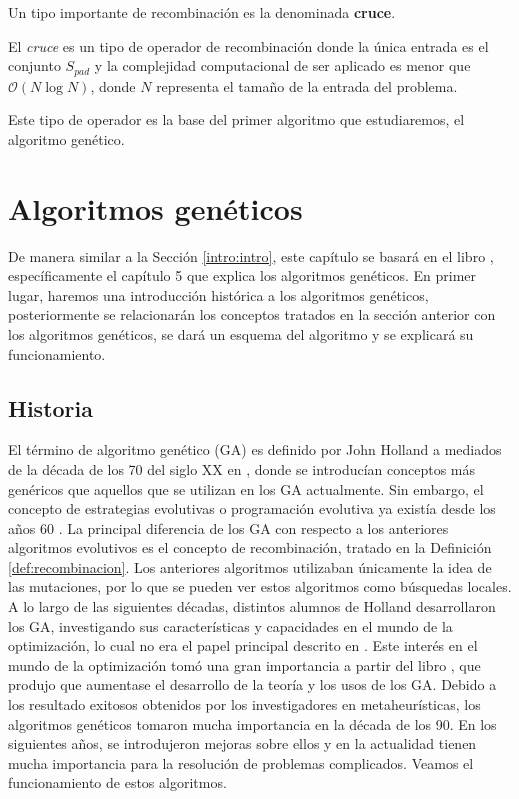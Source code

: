Un tipo importante de recombinación es la denominada \textbf{cruce}.

\begin{definition}\label{def:cruce}
    El \textit{cruce} es un tipo de operador de recombinación donde la única entrada es el conjunto $S_{pad}$ y la complejidad computacional de ser aplicado es menor que $\mathcal{O}(N\log N)$, donde $N$ representa el tamaño de la entrada del problema.
\end{definition}

Este tipo de operador es la base del primer algoritmo que estudiaremos, el algoritmo genético.

\section{Algoritmos genéticos}\label{intro:geneticos}
De manera similar a la Sección \ref{intro:intro}, este capítulo se basará en el libro \cite{metah-hb}, específicamente el capítulo 5 que explica los algoritmos genéticos. En primer lugar, haremos una introducción histórica a los algoritmos genéticos, posteriormente se relacionarán los conceptos tratados en la sección anterior con los algoritmos genéticos, se dará un esquema del algoritmo y se explicará su funcionamiento.
\subsection{Historia}
El término de algoritmo genético (GA) es definido por John Holland a mediados de la década de los 70 del siglo XX en \cite{holland_ga}, donde se introducían conceptos más genéricos que aquellos que se utilizan en los GA actualmente. Sin embargo, el concepto de estrategias evolutivas o programación evolutiva ya existía desde los años 60 \cite{rechenberg-1973,evolutionary-programming}. La principal diferencia de los GA con respecto a los anteriores algoritmos evolutivos es el concepto de recombinación, tratado en la Definición \ref{def:recombinacion}. Los anteriores algoritmos utilizaban únicamente la idea de las mutaciones, por lo que se pueden ver estos algoritmos como búsquedas locales.\\

A lo largo de las siguientes décadas, distintos alumnos de Holland desarrollaron los GA, investigando sus características y capacidades en el mundo de la optimización, lo cual no era el papel principal descrito en \cite{holland_ga}. Este interés en el mundo de la optimización tomó una gran importancia a partir del libro \cite{goldberg-ga}, que produjo que aumentase el desarrollo de la teoría y los usos de los GA. Debido a los resultado exitosos obtenidos por los investigadores en metaheurísticas, los algoritmos genéticos tomaron mucha importancia en la década de los 90. En los siguientes años, se introdujeron mejoras sobre ellos y en la actualidad tienen mucha importancia para la resolución de problemas complicados. Veamos el funcionamiento de estos algoritmos.\\

